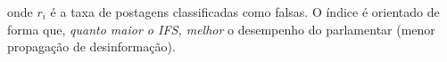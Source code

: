 onde $r_i$ é a taxa de postagens classificadas como falsas. O índice é orientado de forma que, \textit{quanto maior o IFS, melhor} o desempenho do parlamentar (menor propagação de desinformação).


